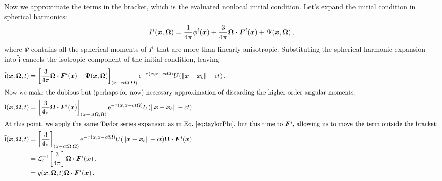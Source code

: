 Now we approximate the terms in the bracket, which is the evaluated nonlocal
initial condition. Let's expand the initial condition in spherical harmonics:
\begin{equation*}
  I^i(\bm{x}, \bm{\Omega}) = \frac{1}{4\pi} \phi^i(\bm{x})
  + \frac{3}{4\pi} \bm{\Omega} \bm{\cdot} \bm{F}^i(\bm{x}) + \Psi(\bm{x}, \bm{\Omega})\,,
\end{equation*}
where $\Psi$ contains all the spherical moments of $I^i$ that are more than
linearly anisotropic. Substituting the spherical harmonic expansion into
$\mathrm{ \tilde i }$ cancels the isotropic component of the initial condition,
leaving
\begin{align} \nonumber
  \mathrm{ \tilde i }(\bm{x}, \bm{\Omega}, t)
  &= \left[ \frac{3}{4\pi} \bm{\Omega} \bm{\cdot} \bm{F}^i(\bm{x}) + \Psi(\bm{x}, \bm{\Omega}) \right]_{( \bm{x} - ct \bm{\Omega}, \bm{\Omega})}
    \mathop{}\!\mathrm{e}^{ -\tau(\bm{x}, \bm{x} - ct \bm{\Omega})}
    U( \left\| \bm{x} - \bm{x}_b \right\| - ct)\,.
  \\
  \intertext{Now we make the dubious but (perhaps for now) necessary
  approximation of discarding the higher-order angular moments:} \nonumber
  \mathrm{ \tilde i }(\bm{x}, \bm{\Omega}, t)
  &= \left[ \frac{3}{4\pi} \bm{\Omega} \bm{\cdot} \bm{F}^i(\bm{x}) \right]_{( \bm{x} - ct \bm{\Omega}, \bm{\Omega})}
    \mathop{}\!\mathrm{e}^{ -\tau(\bm{x}, \bm{x} - ct \bm{\Omega})}
    U( \left\| \bm{x} - \bm{x}_b \right\| - ct)\,.
  \\
  \intertext{At this point, we apply the same Taylor series expansion as in
  Eq.~\eqref{eq:taylorPhi}, but this time to $\bm{F}^i$, allowing us to move
  the term outside the bracket:} \nonumber
  \mathrm{ \tilde i }(\bm{x}, \bm{\Omega}, t)
  &= \left[ \frac{3}{4\pi} \right]_{( \bm{x} - ct \bm{\Omega}, \bm{\Omega})}
    \mathop{}\!\mathrm{e}^{ -\tau(\bm{x}, \bm{x} - ct \bm{\Omega})}
    U( \left\| \bm{x} - \bm{x}_b \right\| - ct)  \bm{\Omega} \bm{\cdot} \bm{F}^i(\bm{x})
  \\ \nonumber
  &= \mathcal{L}_{i}^{-1}\!\left[\frac{3}{4\pi}\right] \bm{\Omega} \bm{\cdot} \bm{F}^i(\bm{x})\,.
  \\\label{eq:tildeI}
  &= g(\bm{x}, \bm{\Omega}, t) \bm{\Omega} \bm{\cdot} \bm{F}^i(\bm{x})\,.
\end{align}

